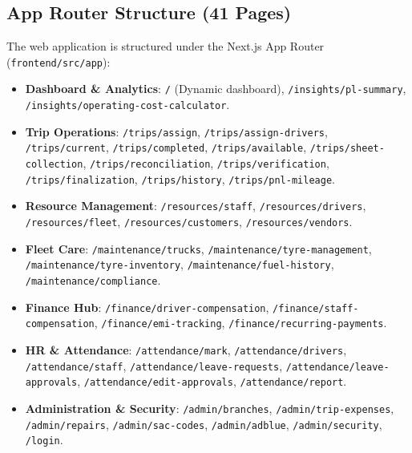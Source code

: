\documentclass[11pt,a4paper]{article}
\begin{document}
\subsection{App Router Structure (41 Pages)}
The web application is structured under the Next.js App Router (\texttt{frontend/src/app}):
\begin{itemize}[leftmargin=1.2em,itemsep=3pt]
  \item \textbf{Dashboard \& Analytics}: \texttt{/} (Dynamic dashboard), \texttt{/insights/pl-summary}, \texttt{/insights/operating-cost-calculator}.
  \item \textbf{Trip Operations}: \texttt{/trips/assign}, \texttt{/trips/assign-drivers}, \texttt{/trips/current}, \texttt{/trips/completed}, \texttt{/trips/available}, \texttt{/trips/sheet-collection}, \texttt{/trips/reconciliation}, \texttt{/trips/verification}, \texttt{/trips/finalization}, \texttt{/trips/history}, \texttt{/trips/pnl-mileage}.
  \item \textbf{Resource Management}: \texttt{/resources/staff}, \texttt{/resources/drivers}, \texttt{/resources/fleet}, \texttt{/resources/customers}, \texttt{/resources/vendors}.
  \item \textbf{Fleet Care}: \texttt{/maintenance/trucks}, \texttt{/maintenance/tyre-management}, \texttt{/maintenance/tyre-inventory}, \texttt{/maintenance/fuel-history}, \texttt{/maintenance/compliance}.
  \item \textbf{Finance Hub}: \texttt{/finance/driver-compensation}, \texttt{/finance/staff-compensation}, \texttt{/finance/emi-tracking}, \texttt{/finance/recurring-payments}.
  \item \textbf{HR \& Attendance}: \texttt{/attendance/mark}, \texttt{/attendance/drivers}, \texttt{/attendance/staff}, \texttt{/attendance/leave-requests}, \texttt{/attendance/leave-approvals}, \texttt{/attendance/edit-approvals}, \texttt{/attendance/report}.
  \item \textbf{Administration \& Security}: \texttt{/admin/branches}, \texttt{/admin/trip-expenses}, \texttt{/admin/repairs}, \texttt{/admin/sac-codes}, \texttt{/admin/adblue}, \texttt{/admin/security}, \texttt{/login}.
\end{itemize}
\end{document}
